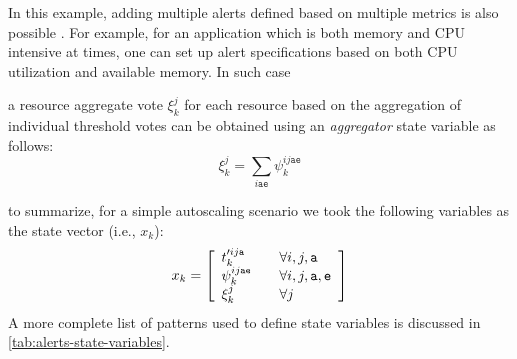 
In this example, adding multiple alerts defined based on multiple metrics is also possible . For example, for an application which is both memory and CPU intensive at times, one can set up alert specifications based on both CPU utilization and available memory. 
In such case 

a resource aggregate vote $\xi^{j}_k$ for each resource based on the aggregation of individual threshold votes
can be obtained using an \textit{aggregator} state variable as follows: 
\[
\xi^{j}_k=\sum_{i\mathtt{a}\mathtt{e}} \psi^{ij\mathtt{a}\mathtt{e}}_k
\]

to summarize, for a simple autoscaling scenario we took the following variables as the state vector (i.e., $x_k$): 
\[
 x_k=\left[
 \begin{array}{l l}
    t'^{ij\mathtt{a}}_{k} & \quad \forall i,j,\mathtt{a} \\
    \psi^{ij\mathtt{a}\mathtt{e}}_k  & \quad \forall i,j,\mathtt{a},\mathtt{e} \\
    \xi^{j}_k  & \quad \forall j
  \end{array} \right] 
\]
A more complete list of patterns used to define state variables is discussed in \ref{tab:alerts-state-variables}. 


